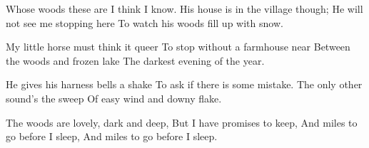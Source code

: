 \documentclass[fontsize=9, a5paper]{scrbook}
\newcommand\blankpage{%
    \null
    \thispagestyle{empty}%
    \addtocounter{page}{-1}%
    \newpage}
\begin{document}
\pagebreak

\afterpage{\blankpage}
\begin{poem}
	\begin{stanza}
		Whose woods these are I think I know.  \verseline
		His house is in the village though;   \verseline
		He will not see me stopping here   \verseline
		To watch his woods fill up with snow.   
	\end{stanza}
	
	\begin{stanza}
		My little horse must think it queer   \verseline
		To stop without a farmhouse near   \verseline
		Between the woods and frozen lake   \verseline
		The darkest evening of the year.   
	\end{stanza}
	
	\begin{stanza}
		He gives his harness bells a shake   \verseline
		To ask if there is some mistake.   \verseline
		The only other sound’s the sweep   \verseline
		Of easy wind and downy flake.   
	\end{stanza}
	
	\begin{stanza}
		The woods are lovely, dark and deep,   \verseline
		But I have promises to keep,   \verseline
		And miles to go before I sleep,   \verseline
		And miles to go before I sleep.
	\end{stanza}
\end{poem}

\pagebreak
\end{document}
